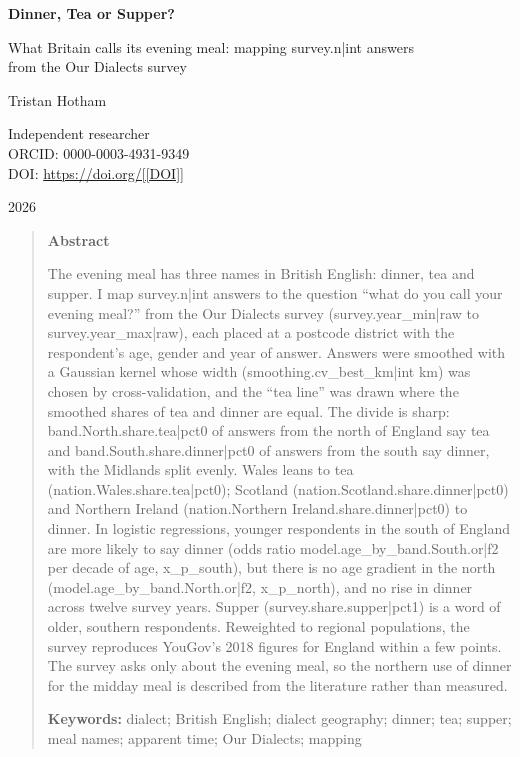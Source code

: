 \documentclass[11pt,a4paper]{article}
\begin{document}
\begin{center}
{\Large\bfseries Dinner, Tea or Supper?\par}
\vspace{0.4em}
{\large What Britain calls its evening meal: mapping {{survey.n|int}} answers\\from the Our Dialects survey\par}
\vspace{1.2em}
{\large Tristan Hotham\par}
\vspace{0.3em}
{\small Independent researcher\\
ORCID: 0000-0003-4931-9349\\
DOI: \href{https://doi.org/[[DOI]]}{https://doi.org/[[DOI]]}\par}
\vspace{0.8em}
2026
\end{center}

\begin{quote}
\small
\begin{center}\textbf{Abstract}\end{center}
The evening meal has three names in British English: dinner, tea and supper. I map {{survey.n|int}} answers to the question ``what do you call your evening meal?'' from the Our Dialects survey ({{survey.year_min|raw}} to {{survey.year_max|raw}}), each placed at a postcode district with the respondent's age, gender and year of answer. Answers were smoothed with a Gaussian kernel whose width ({{smoothing.cv_best_km|int}} km) was chosen by cross-validation, and the ``tea line'' was drawn where the smoothed shares of tea and dinner are equal. The divide is sharp: {{band.North.share.tea|pct0}} of answers from the north of England say tea and {{band.South.share.dinner|pct0}} of answers from the south say dinner, with the Midlands split evenly. Wales leans to tea ({{nation.Wales.share.tea|pct0}}); Scotland ({{nation.Scotland.share.dinner|pct0}}) and Northern Ireland ({{nation.Northern Ireland.share.dinner|pct0}}) to dinner. In logistic regressions, younger respondents in the south of England are more likely to say dinner (odds ratio {{model.age_by_band.South.or|f2}} per decade of age, {{x_p_south}}), but there is no age gradient in the north ({{model.age_by_band.North.or|f2}}, {{x_p_north}}), and no rise in dinner across twelve survey years. Supper ({{survey.share.supper|pct1}}) is a word of older, southern respondents. Reweighted to regional populations, the survey reproduces YouGov's 2018 figures for England within a few points. The survey asks only about the evening meal, so the northern use of dinner for the midday meal is described from the literature rather than measured.

\textbf{Keywords:} dialect; British English; dialect geography; dinner; tea; supper; meal names; apparent time; Our Dialects; mapping
\end{quote}
\end{document}
